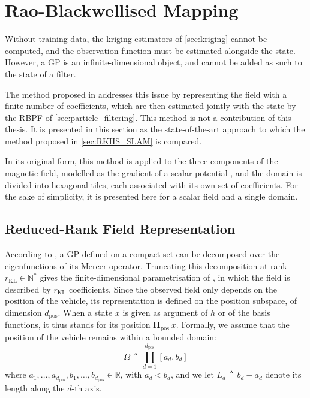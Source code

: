 \section{Rao-Blackwellised Mapping}\label{sec:RBPF_SLAM}

Without training data, the kriging estimators of \cref{sec:kriging} cannot be computed, and the observation function must be estimated alongside the state. However, a GP is an infinite-dimensional object, and cannot be added as such to the state of a filter.

The method proposed in \cite{bib:magnetic-SLAM-3D} addresses this issue by representing the field with a finite number of coefficients, which are then estimated jointly with the state by the RBPF of \cref{sec:particle_filtering}. This method is not a contribution of this thesis. It is presented in this section as the state-of-the-art approach to which the method proposed in \cref{sec:RKHS_SLAM} is compared.

In its original form, this method is applied to the three components of the magnetic field, modelled as the gradient of a scalar potential \cite{bib:magnetic-GP,bib:magnetic-interpolation}, and the domain is divided into hexagonal tiles, each associated with its own set of coefficients. For the sake of simplicity, it is presented here for a scalar field and a single domain.

\subsection{Reduced-Rank Field Representation}

According to , a GP defined on a compact set can be decomposed over the eigenfunctions of its Mercer operator. Truncating this decomposition at rank $r_{\mathrm{KL}}\in\mathbb{N}^*$ gives the finite-dimensional parametrisation of , in which the field is described by $r_{\mathrm{KL}}$ coefficients. Since the observed field only depends on the position of the vehicle, its representation is defined on the position subspace, of dimension $d_{\mathrm{pos}}$. When a state $x$ is given as argument of $h$ or of the basis functions, it thus stands for its position $\boldsymbol{\Pi}_{\mathrm{pos}}\:x$. Formally, we assume that the position of the vehicle remains within a bounded domain:
\begin{equation}
	\Omega\triangleq\prod_{d=1}^{d_{\mathrm{pos}}}[a_d,b_d]
\end{equation}
where $a_1,\dots,a_{d_{\mathrm{pos}}},b_1,\dots,b_{d_{\mathrm{pos}}}\in\mathbb{R}$, with $a_d<b_d$, and we let $L_d\triangleq b_d-a_d$ denote its length along the $d$-th axis.

